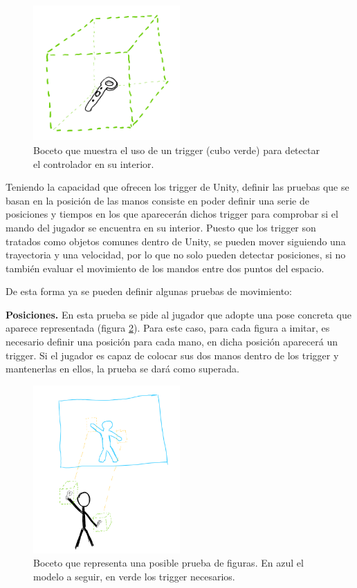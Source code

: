 \begin{figure}
  \centering
    \includegraphics[width=0.5\textwidth]{04.Desarrollo/02.Entrega2/01.Iteracion2_1/00.Figuras/02.trigger.png}
    \caption{Boceto que muestra el uso de un trigger (cubo verde) para detectar el controlador en su interior.}
    \label{fig:E2_trigger}
\end{figure}


Teniendo la capacidad que ofrecen los trigger de Unity, definir las pruebas que se basan en la posición de las manos consiste en poder definir una serie de posiciones y tiempos en los que aparecerán dichos trigger para comprobar si el mando del jugador se encuentra en su interior. Puesto que los trigger son tratados como objetos comunes dentro de Unity, se pueden mover siguiendo una trayectoria y una velocidad, por lo que no solo pueden detectar posiciones, si no también evaluar el movimiento de los mandos entre dos puntos del espacio.

De esta forma ya se pueden definir algunas pruebas de movimiento:

\textbf{Posiciones.} En esta prueba se pide al jugador que adopte una pose concreta que aparece representada (figura \ref{fig:E2_poses}). Para este caso, para cada figura a imitar, es necesario definir una posición para cada mano, en dicha posición aparecerá un trigger. Si el jugador es capaz de colocar sus dos manos dentro de los trigger y mantenerlas en ellos, la prueba se dará como superada.


\begin{figure}
  \centering
    \includegraphics[width=0.5\textwidth]{04.Desarrollo/02.Entrega2/01.Iteracion2_1/00.Figuras/03.poses.png}
    \caption{Boceto que representa una posible prueba de figuras. En azul el modelo a seguir, en verde los trigger necesarios.}
    \label{fig:E2_poses}
\end{figure}

